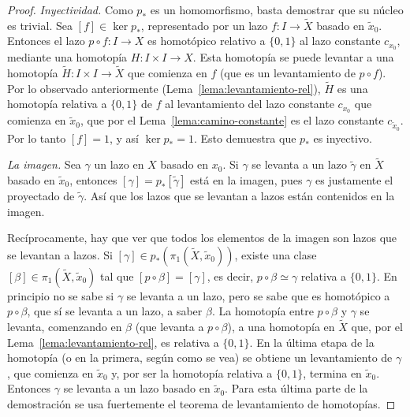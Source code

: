 \documentclass[11pt]{article}
\begin{document}
\begin{proof}
\emph{Inyectividad.} Como $p_*$ es un homomorfismo, basta demostrar que su núcleo es trivial. Sea $[f]\in\ker p_*$, representado por un lazo $f\colon I\to\tilde X$ basado en $\tilde x_0$. Entonces el lazo $p\circ f\colon I\to X$ es homotópico relativo a $\{0,1\}$ al lazo constante $c_{x_0}$, mediante una homotopía $H\colon I\times I\to X$. Esta homotopía se puede levantar a una homotopía $\tilde H\colon I\times I\to\tilde X$ que comienza en $f$ (que es un levantamiento de $p\circ f$). Por lo observado anteriormente (Lema~\ref{lema:levantamiento-rel}), $\tilde H$ es una homotopía relativa a $\{0,1\}$ de $f$ al levantamiento del lazo constante $c_{x_0}$ que comienza en $\tilde x_0$, que por el Lema~\ref{lema:camino-constante} es el lazo constante $c_{\tilde x_0}$. Por lo tanto $[f]=1$, y así $\ker p_*=1$. Esto demuestra que $p_*$ es inyectivo.

\medskip\noindent\emph{La imagen.} Sea $\gamma$ un lazo en $X$ basado en $x_0$. Si $\gamma$ se levanta a un lazo $\tilde\gamma$ en $\tilde X$ basado en $\tilde x_0$, entonces $[\gamma]=p_*[\tilde\gamma]$ está en la imagen, pues $\gamma$ es justamente el proyectado de $\tilde\gamma$. Así que los lazos que se levantan a lazos están contenidos en la imagen.

Recíprocamente, hay que ver que todos los elementos de la imagen son lazos que se levantan a lazos. Si $[\gamma]\in p_*(\pi_1(\tilde X,\tilde x_0))$, existe una clase $[\beta]\in\pi_1(\tilde X,\tilde x_0)$ tal que $[p\circ\beta]=[\gamma]$, es decir, $p\circ\beta\simeq\gamma$ relativa a $\{0,1\}$. En principio no se sabe si $\gamma$ se levanta a un lazo, pero se sabe que es homotópico a $p\circ\beta$, que sí se levanta a un lazo, a saber $\beta$. La homotopía entre $p\circ\beta$ y $\gamma$ se levanta, comenzando en $\beta$ (que levanta a $p\circ\beta$), a una homotopía en $\tilde X$ que, por el Lema~\ref{lema:levantamiento-rel}, es relativa a $\{0,1\}$. En la última etapa de la homotopía (o en la primera, según como se vea) se obtiene un levantamiento de $\gamma$, que comienza en $\tilde x_0$ y, por ser la homotopía relativa a $\{0,1\}$, termina en $\tilde x_0$. Entonces $\gamma$ se levanta a un lazo basado en $\tilde x_0$. Para esta última parte de la demostración se usa fuertemente el teorema de levantamiento de homotopías.
\end{proof}
\end{document}
